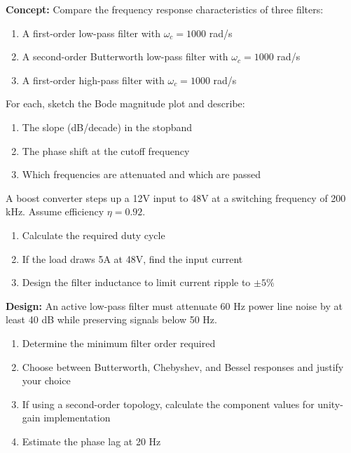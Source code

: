 \begin{exercise}
\textbf{Concept:} Compare the frequency response characteristics of three filters:
\begin{enumerate}[label=(\alph*)]
    \item A first-order low-pass filter with $\omega_c = 1000$ rad/s
    \item A second-order Butterworth low-pass filter with $\omega_c = 1000$ rad/s
    \item A first-order high-pass filter with $\omega_c = 1000$ rad/s
\end{enumerate}

For each, sketch the Bode magnitude plot and describe:
\begin{enumerate}[label=(\alph*)]
    \item The slope (dB/decade) in the stopband
    \item The phase shift at the cutoff frequency
    \item Which frequencies are attenuated and which are passed
\end{enumerate}
\end{exercise}

\begin{exercise}
A boost converter steps up a 12V input to 48V at a switching frequency of 200 kHz. Assume efficiency $\eta = 0.92$.

\begin{enumerate}[label=(\alph*)]
    \item Calculate the required duty cycle
    \item If the load draws 5A at 48V, find the input current
    \item Design the filter inductance to limit current ripple to $\pm 5\%$
\end{enumerate}
\end{exercise}

\begin{exercise}
\textbf{Design:} An active low-pass filter must attenuate 60 Hz power line noise by at least 40 dB while preserving signals below 50 Hz.

\begin{enumerate}[label=(\alph*)]
    \item Determine the minimum filter order required
    \item Choose between Butterworth, Chebyshev, and Bessel responses and justify your choice
    \item If using a second-order topology, calculate the component values for unity-gain implementation
    \item Estimate the phase lag at 20 Hz
\end{enumerate}
\end{exercise}

